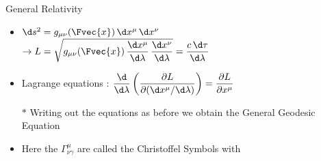 \Tr
%
\begin{center}
{\blue General Relativity}
\end{center}
%
\begin{itemize}
\item $\d s^{2}=g_{\mu \nu}(\Fvec{x})\, \d x^{\mu}\, \d x^{\nu}$
      $\displaystyle \rightarrow L=\sqrt{g_{\mu \nu}(\Fvec{x})\,\frac{\d x^{\mu}}{\d\lambda}\,\frac{\d x^{\nu}}{\d \lambda}}=
       \frac{c\,\d\tau}{\d\lambda}$
\item Lagrange equations :
      $\displaystyle \frac{\d}{\d \lambda}\left(\frac{\partial L}{\partial(\d x^{\mu}/\d \lambda)}\right)=
       \frac{\partial L}{\partial x^{\mu}}$
\item[$\ast$] Writing out the equations as before we obtain the {\blue General Geodesic Equation}
\end{itemize}
%
\begin{center}
{\red {}}
\end{center}
%
\begin{itemize}
\item Here the {\blue $\displaystyle \Gamma^{\mu}_{\nu\gamma}$} are called the {\blue Christoffel Symbols} with
\end{itemize}
%
\begin{center}
{\red {}}
\end{center}
